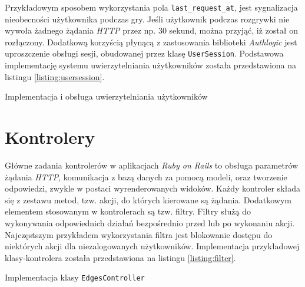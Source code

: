 \documentclass[11pt,twoside]{report}
\begin{document}
Przykładowym sposobem wykorzystania pola \texttt{last\_request\_at},
jest sygnalizacja nieobecności użytkownika podczas gry. Jeśli
użytkownik podczas rozgrywki nie wywoła żadnego żądania \emph{HTTP}
przez np. 30 sekund, można przyjąć, iż został on rozłączony. Dodatkową
korzyścią płynącą z zastosowania biblioteki \emph{Authlogic} jest
uproszczenie obsługi sesji, obudowanej przez klasę
\texttt{UserSession}. Podstawowa implementację systemu
uwierzytelniania użytkowników została przedstawiona na listingu
\ref{listing:usersession}.

\begin{listing}
  
  \caption{Implementacja i obsługa uwierzytelniania użytkowników}
  \label{listing:usersession}
\end{listing}

\section{Kontrolery}

Główne zadania kontrolerów w aplikacjach \emph{Ruby on Rails} to
obsługa parametrów żądania \emph{HTTP}, komunikacja z bazą danych za
pomocą modeli, oraz tworzenie odpowiedzi, zwykle w postaci
wyrenderowanych widoków. Każdy kontroler składa się z zestawu metod,
tzw. akcji, do których kierowane są żądania. Dodatkowym elementem
stosowanym w kontrolerach są tzw. filtry. Filtry służą do wykonywania
odpowiednich działań bezpośrednio przed lub po wykonaniu
akcji. Najczęstszym przykładem wykorzystania filtra jest blokowanie
dostępu do niektórych akcji dla niezalogowanych
użytkowników. Implementacja przykładowej klasy-kontrolera została
przedstawiona na listingu \ref{listing:filter}.

\begin{listing}
  
  \caption{Implementacja klasy \texttt{EdgesController}}
  \label{listing:filter}
\end{listing}
\end{document}
